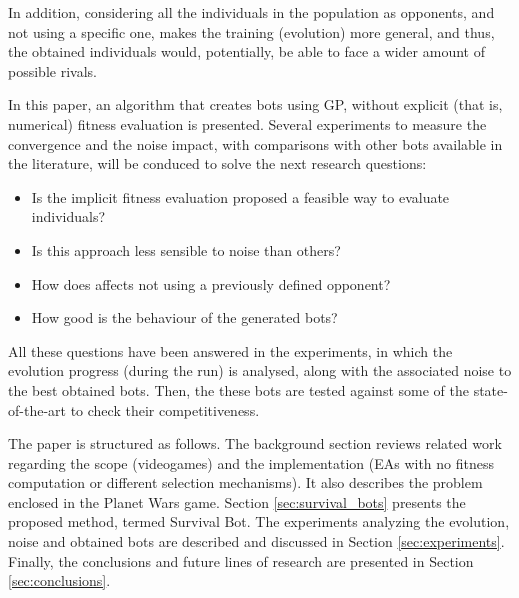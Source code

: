 \documentclass[conference]{IEEEtran}
\begin{document}

In addition,  considering all the individuals in the population as opponents, and not using a specific one, makes the training (evolution) more
general, and thus, the obtained individuals would, potentially, be able to face a wider amount of possible rivals.



In this paper, an algorithm that creates bots using GP, without explicit (that is, numerical) fitness evaluation is presented. Several experiments to measure the convergence and the noise impact, with comparisons with other bots available in the literature, will be conduced to solve the next research questions:
\begin{itemize}
\item Is the implicit fitness evaluation proposed a feasible way to evaluate individuals?
\item Is this approach less sensible to noise than others?
\item How does affects not using a previously defined opponent?
\item How good is the behaviour of the generated bots?
\end{itemize}

All these questions have been answered in the experiments, in which the evolution progress (during the run) is analysed, along with the associated noise to the best obtained bots. Then, the these bots are tested against some of the state-of-the-art to check their competitiveness.

The paper is structured as follows. The background section reviews related work regarding the scope (videogames) and the implementation (EAs with no fitness computation or different selection mechanisms). It also describes the problem enclosed in the Planet Wars game.
Section \ref{sec:survival_bots} presents the proposed method, termed {Survival Bot}.
The experiments analyzing the evolution, noise and obtained bots are described and discussed in Section \ref{sec:experiments}. Finally, the conclusions and future lines of research are presented in Section \ref{sec:conclusions}.
\end{document}
